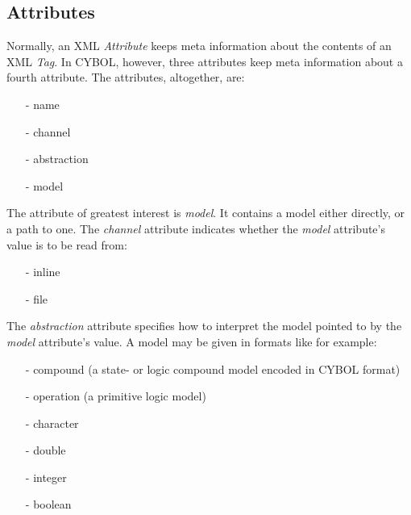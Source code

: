 %
%
%
%
%
%

\subsection{Attributes}
\label{attributes_heading}

Normally, an XML \emph{Attribute} keeps meta information about the contents of
an XML \emph{Tag}. In CYBOL, however, three attributes keep meta information
about a fourth attribute. The attributes, altogether, are:

\begin{itemize}
    \item[-] name
    \item[-] channel
    \item[-] abstraction
    \item[-] model
\end{itemize}

The attribute of greatest interest is \emph{model}. It contains a model either
directly, or a path to one. The \emph{channel} attribute indicates whether the
\emph{model} attribute's value is to be read from:

\begin{itemize}
    \item[-] inline
    \item[-] file
\end{itemize}

The \emph{abstraction} attribute specifies how to interpret the model pointed
to by the \emph{model} attribute's value. A model may be given in formats like
for example:

\begin{itemize}
    \item[-] compound (a state- or logic compound model encoded in CYBOL format)
    \item[-] operation (a primitive logic model)
    \item[-] character
    \item[-] double
    \item[-] integer
    \item[-] boolean
\end{itemize}

